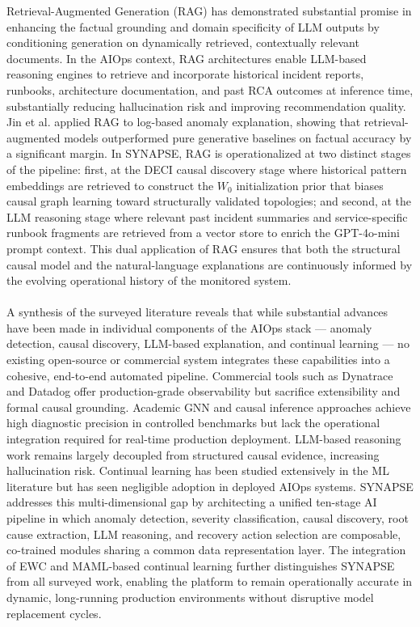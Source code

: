 \hspace*{0.3in} Retrieval-Augmented Generation (RAG) \cite{lewis2020rag} has demonstrated substantial promise in enhancing the factual grounding and domain specificity of LLM outputs by conditioning generation on dynamically retrieved, contextually relevant documents. In the AIOps context, RAG architectures enable LLM-based reasoning engines to retrieve and incorporate historical incident reports, runbooks, architecture documentation, and past RCA outcomes at inference time, substantially reducing hallucination risk and improving recommendation quality. Jin et al. \cite{jin2023rag} applied RAG to log-based anomaly explanation, showing that retrieval-augmented models outperformed pure generative baselines on factual accuracy by a significant margin. In SYNAPSE, RAG is operationalized at two distinct stages of the pipeline: first, at the DECI causal discovery stage where historical pattern embeddings are retrieved to construct the $W_0$ initialization prior that biases causal graph learning toward structurally validated topologies; and second, at the LLM reasoning stage where relevant past incident summaries and service-specific runbook fragments are retrieved from a vector store to enrich the GPT-4o-mini prompt context. This dual application of RAG ensures that both the structural causal model and the natural-language explanations are continuously informed by the evolving operational history of the monitored system.\\\\

\hspace*{0.3in} A synthesis of the surveyed literature reveals that while substantial advances have been made in individual components of the AIOps stack — anomaly detection, causal discovery, LLM-based explanation, and continual learning — no existing open-source or commercial system integrates these capabilities into a cohesive, end-to-end automated pipeline. Commercial tools such as Dynatrace and Datadog offer production-grade observability but sacrifice extensibility and formal causal grounding. Academic GNN and causal inference approaches achieve high diagnostic precision in controlled benchmarks but lack the operational integration required for real-time production deployment. LLM-based reasoning work remains largely decoupled from structured causal evidence, increasing hallucination risk. Continual learning has been studied extensively in the ML literature but has seen negligible adoption in deployed AIOps systems. SYNAPSE addresses this multi-dimensional gap by architecting a unified ten-stage AI pipeline in which anomaly detection, severity classification, causal discovery, root cause extraction, LLM reasoning, and recovery action selection are composable, co-trained modules sharing a common data representation layer. The integration of EWC and MAML-based continual learning further distinguishes SYNAPSE from all surveyed work, enabling the platform to remain operationally accurate in dynamic, long-running production environments without disruptive model replacement cycles.\\\\
